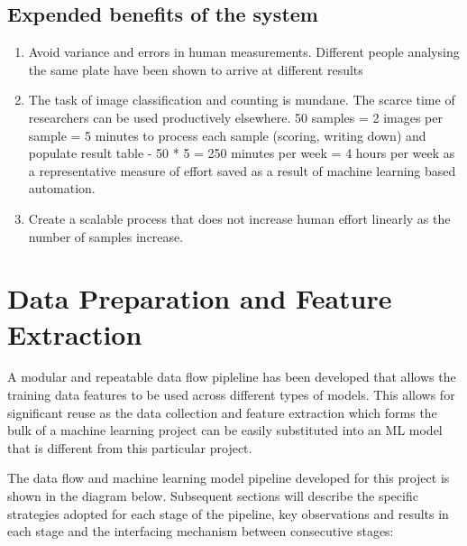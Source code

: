 \documentclass[a4paper,twoside,12pt]{report}
\begin{document}

\section{Expended benefits of the system}

\begin{enumerate}
\item Avoid variance and errors in human measurements.   Different people analysing the same plate have been shown to arrive at different results
\item The task of image classification and counting is mundane.  The scarce time of researchers can be used productively elsewhere. 
50 samples = 2 images per sample = 5 minutes to process each sample (scoring, writing down) and populate result table -  50 * 5 = 250 minutes per week = 4 hours per week as a representative measure of effort saved as a result of machine learning based automation.
\item Create a scalable process that does not increase human effort linearly as the number of samples increase. 
\end{enumerate}

\chapter{Data Preparation and Feature Extraction}

A modular and repeatable data flow pipleline has been developed that allows the training data features to be used across different types of models.    This allows for significant reuse as the data collection and feature extraction which forms the bulk of a machine learning project can be easily substituted into an ML model that is different from this particular project. 

The data flow and machine learning model pipeline developed for this project is shown in the diagram below.   Subsequent sections will describe the specific strategies adopted for each stage of the pipeline,  key observations and results in each stage and the interfacing mechanism between consecutive stages: 
\end{document}
